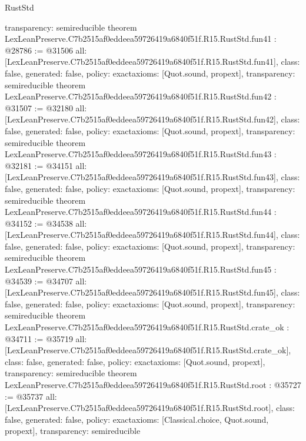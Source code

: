 \begin{lexlean}{RustStd}
\begin{coremodule}
{  transparency: semireducible
}
theorem LexLeanPreserve.C7b2515af0eddeea59726419a6840f51f.R15.RustStd.fun41 : @28786 := @31506 {
  all: [LexLeanPreserve.C7b2515af0eddeea59726419a6840f51f.R15.RustStd.fun41],
  class: false,
  generated: false,
  policy: exact{axioms: [Quot.sound, propext]},
  transparency: semireducible
}
theorem LexLeanPreserve.C7b2515af0eddeea59726419a6840f51f.R15.RustStd.fun42 : @31507 := @32180 {
  all: [LexLeanPreserve.C7b2515af0eddeea59726419a6840f51f.R15.RustStd.fun42],
  class: false,
  generated: false,
  policy: exact{axioms: [Quot.sound, propext]},
  transparency: semireducible
}
theorem LexLeanPreserve.C7b2515af0eddeea59726419a6840f51f.R15.RustStd.fun43 : @32181 := @34151 {
  all: [LexLeanPreserve.C7b2515af0eddeea59726419a6840f51f.R15.RustStd.fun43],
  class: false,
  generated: false,
  policy: exact{axioms: [Quot.sound, propext]},
  transparency: semireducible
}
theorem LexLeanPreserve.C7b2515af0eddeea59726419a6840f51f.R15.RustStd.fun44 : @34152 := @34538 {
  all: [LexLeanPreserve.C7b2515af0eddeea59726419a6840f51f.R15.RustStd.fun44],
  class: false,
  generated: false,
  policy: exact{axioms: [Quot.sound, propext]},
  transparency: semireducible
}
theorem LexLeanPreserve.C7b2515af0eddeea59726419a6840f51f.R15.RustStd.fun45 : @34539 := @34707 {
  all: [LexLeanPreserve.C7b2515af0eddeea59726419a6840f51f.R15.RustStd.fun45],
  class: false,
  generated: false,
  policy: exact{axioms: [Quot.sound, propext]},
  transparency: semireducible
}
theorem LexLeanPreserve.C7b2515af0eddeea59726419a6840f51f.R15.RustStd.crate_ok : @34711 := @35719 {
  all: [LexLeanPreserve.C7b2515af0eddeea59726419a6840f51f.R15.RustStd.crate_ok],
  class: false,
  generated: false,
  policy: exact{axioms: [Quot.sound, propext]},
  transparency: semireducible
}
theorem LexLeanPreserve.C7b2515af0eddeea59726419a6840f51f.R15.RustStd.root : @35727 := @35737 {
  all: [LexLeanPreserve.C7b2515af0eddeea59726419a6840f51f.R15.RustStd.root],
  class: false,
  generated: false,
  policy: exact{axioms: [Classical.choice, Quot.sound, propext]},
  transparency: semireducible
}


\end{coremodule}
\end{lexlean}
